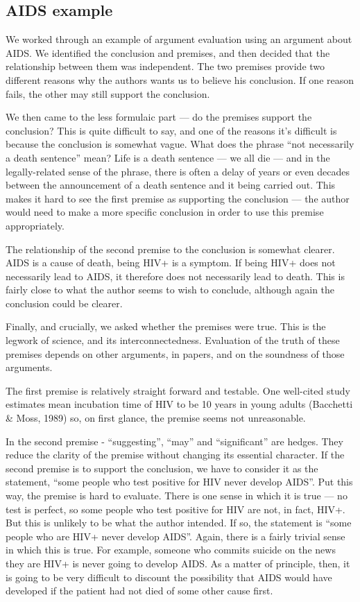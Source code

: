 \documentclass[12pt]{article}
\begin{document}
\subsection{AIDS example}

We worked through an example of argument evaluation using an argument
about AIDS. We identified the conclusion and premises, and then
decided that the relationship between them was independent. The two
premises provide two different reasons why the authors wants us to
believe his conclusion. If one reason fails, the other may still
support the conclusion.

We then came to the less formulaic part --- do the premises support
the conclusion? This is quite difficult to say, and one of the reasons
it's difficult is because the conclusion is somewhat vague. What does
the phrase ``not necessarily a death sentence'' mean? Life is a death
sentence --- we all die --- and in the legally-related sense of the
phrase, there is often a delay of years or even decades between the
announcement of a death sentence and it being carried out. This makes
it hard to see the first premise as supporting the conclusion --- the
author would need to make a more specific conclusion in order to use
this premise appropriately.

The relationship of the second premise to the conclusion is somewhat
clearer. AIDS is a cause of death, being HIV+ is a symptom. If being
HIV+ does not necessarily lead to AIDS, it therefore does not
necessarily lead to death. This is fairly close to what the author
seems to wish to conclude, although again the conclusion could be
clearer.

Finally, and crucially, we asked whether the premises were true. This
is the legwork of science, and its interconnectedness. Evaluation of
the truth of these premises depends on other arguments, in papers, and
on the soundness of those arguments.

The first premise is relatively straight forward and testable. One
well-cited study estimates mean incubation time of HIV to be 10 years
in young adults (Bacchetti \& Moss, 1989) so, on first glance, the
premise seems not unreasonable.

In the second premise - ``suggesting'', ``may'' and ``significant''
are hedges. They reduce the clarity of the premise without changing
its essential character. If the second premise is to support the
conclusion, we have to consider it as the statement, ``some people who
test positive for HIV never develop AIDS''. Put this way, the premise
is hard to evaluate. There is one sense in which it is true --- no
test is perfect, so some people who test positive for HIV are not, in
fact, HIV+. But this is unlikely to be what the author intended. If
so, the statement is ``some people who are HIV+ never develop
AIDS''. Again, there is a fairly trivial sense in which this is
true. For example, someone who commits suicide on the news they are
HIV+ is never going to develop AIDS. As a matter of principle, then,
it is going to be very difficult to discount the possibility that AIDS
would have developed if the patient had not died of some other cause
first.
\end{document}
